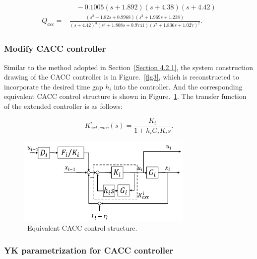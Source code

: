 \documentclass[journal]{IEEEtran}
\begin{document}
\begin{small}
  \begin{equation}
    \begin{gathered}
      \begin{aligned}
                   & \quad -0.1005(s+1.892)(s+4.38)(s+4.42)                                                                                                                      \\
        Q_{a c c}= & \frac{\left(s^{2}+1.82 s+0.9968\right)\left(s^{2}+1.969 s+1.238\right)}{(s+4.42)^{3}\left(s^{2}+1.808 s+0.9741\right)\left(s^{2}+1.836 s+1.027\right)^{2}}.
      \end{aligned}
    \end{gathered}
  \end{equation}
\end{small}

\subsubsection{Modify CACC controller}
\label{Section 4.2.3}

Similar to the method adopted in Section~\ref{Section 4.2.1}, the system construction drawing of the CACC controller is in Figure.~\ref{fig3}, which is reconstructed to incorporate the desired time gap $h_i$ into the controller. And the corresponding equivalent CACC control structure is shown in Figure.~\ref{fig7}. The transfer function of the extended controller is as follows:

\begin{equation}
  K_{e x t, c a c c}^{i}(s)=\frac{K_{i}}{1+h_{i} G_{i} K_{i} s}.
\end{equation}

\begin{figure}
  \centering
  \includegraphics[width=8.5cm]{figs/fig7.png}
  \caption{~Equivalent CACC control structure.}
  \label{fig7}
\end{figure}

\subsubsection{YK parametrization for CACC controller}
\label{Section 4.2.4}
\end{document}
